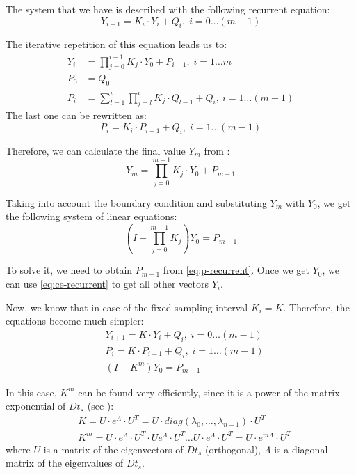 The system that we have is described with the following recurrent equation:
\begin{equation} \label{eq:ce-recurrent}
  Y_{i + 1} = K_i \cdot Y_i + Q_i, \; i = 0 \dots (m - 1)
\end{equation}

The iterative repetition of this equation leads us to:
\begin{align}
  Y_i & = \prod_{j = 0}^{i - 1} K_j \cdot Y_0 + P_{i - 1}, \; i = 1 \dots m \label{eq:y-recurrent} \\
  P_0 & = Q_0 \nonumber \\
  P_i & = \sum_{l = 1}^i \prod_{j = l}^i K_j \cdot Q_{l - 1} + Q_i, \: i = 1 \dots (m - 1) \nonumber
\end{align}
The last one can be rewritten as:
\begin{equation} \label{eq:p-recurrent}
  P_i = K_i \cdot P_{i - 1} + Q_i, \; i = 1 \dots (m - 1)
\end{equation}

Therefore, we can calculate the final value $Y_m$ from :
\[
  Y_m = \prod_{j = 0}^{m - 1} K_j \cdot Y_0 + P_{m - 1}
\]

Taking into account the boundary condition  and substituting $Y_m$ with $Y_0$, we get the following system of linear equations:
\[
  (I - \prod_{j = 0}^{m - 1} K_j) Y_0 = P_{m - 1}
\]

To solve it, we need to obtain $P_{m - 1}$ from \eqref{eq:p-recurrent}. Once we get $Y_0$, we can use \eqref{eq:ce-recurrent} to get all other vectors $Y_i$.

Now, we know that in case of the fixed sampling interval $K_i = K$. Therefore, the equations become much simpler:
\begin{align}
  & Y_{i + 1} = K \cdot Y_i + Q_i, \; i = 0 \dots (m - 1) \nonumber \\
  & P_i = K \cdot P_{i - 1} + Q_i, \; i = 1 \dots (m - 1) \nonumber \\
  & (I - K^m) Y_0 = P_{m - 1} \label{eq:linear-system}
\end{align}

In this case, $K^m$ can be found very efficiently, since it is a power of the matrix exponential of $D t_s$ (see ):
\begin{align*}
  & K = U \cdot e^{\Lambda} \cdot U^T = U \cdot diag(\lambda_0, \dots, \lambda_{n - 1}) \cdot U^T \\
  & K^m = U \cdot e^{\Lambda} \cdot U^T \cdot U e^{\Lambda} \cdot U^T \dots U \cdot e^{\Lambda} \cdot U^T = U \cdot e^{m \Lambda} \cdot U^T
\end{align*}
where $U$ is a matrix of the eigenvectors of $D t_s$ (orthogonal), $\Lambda$ is a diagonal matrix of the eigenvalues of $D t_s$.

